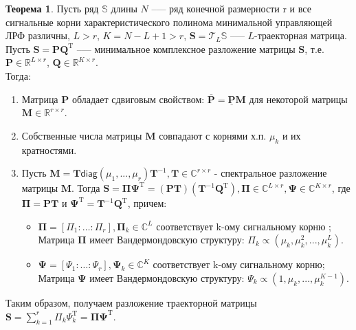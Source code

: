 \documentclass[specialist, substylefile = spbureport.rtx, subf,href,colorlinks=true, 12pt]{disser}
\theoremstyle{definition}
\newtheorem{theorem}{Теорема}
\begin{document}
\begin{theorem}
\label{th1}
Пусть ряд $\mathbb{S}$ длины $N$ --— ряд конечной размерности r и все сигнальные корни характеристического полинома минимальной управляющей ЛРФ различны, $L > r$, $K = N - L + 1 > r$, $\mathbf{S} = \mathcal{T}_L\mathbb{S}$ --— $L$-траекторная матрица. Пусть $\mathbf{S} = \mathbf{P Q}^{\mathrm{T}}$ --— минимальное комплексное разложение матрицы $\mathbf{S}$, т.е. $\mathbf{P} \in \mathbb{R}^{L \times r}$, $\mathbf{Q} \in \mathbb{R}^{K \times r}$. \\
    \hspace*{0.5cm} Тогда:
    \begin{enumerate}
        \item Матрица $\mathbf{P}$ обладает сдвиговым свойством: $\overline{\mathbf{P}} = \underline{\mathbf{P}}\mathbf{M}$ для некоторой матрицы $\mathbf{M} \in \mathbb{R}^{r \times r}$.
        \item Собственные числа матрицы $\mathbf{M}$ совпадают с корнями х.п. $\mu_k$ и их кратностями.
        \item Пусть $\mathbf{M} = \mathbf{T}\mathsf{diag}(\mu_1, ..., \mu_r)\mathbf{T}^{-1}, \mathbf{T} \in \mathbb{C}^{r \times r}$ - спектральное разложение матрицы $\mathbf{M}$.
        Тогда $\mathbf{S} = \mathbf{\Pi \Psi}^{\mathrm{T}} = (\mathbf{PT})(\mathbf{T}^{-1}\mathbf{ Q}^{\mathrm{T}}), \mathbf{\Pi} \in \mathbb{C}^{L \times r}, \mathbf{\Psi} \in \mathbb{C}^{K \times r}$, где $\mathbf{\Pi} = \mathbf{PT}$ и $\mathbf{\Psi}^{\mathrm{T}} = \mathbf{T}^{-1}\mathbf{Q}^{\mathrm{T}}$, причем:
        \begin{itemize}
            \item $\mathbf{\Pi} = [\Pi_1: \ldots :\Pi_r], \mathbf{\Pi}_k \in \mathbb{C}^{L}$ соответствует k-ому сигнальному корню ; Матрица $\mathbf{\Pi}$ имеет Вандермондовскую структуру: $\Pi_k \propto (\mu_k, \mu_k^2, ..., \mu_k^L)$.
            
            \item $\mathbf{\Psi} = [\Psi_1: \ldots :\Psi_r], \mathbf{\Psi}_k \in \mathbb{C}^{K}$ соответствует k-ому сигнальному корню; Матрица $\mathbf{\Psi}$ имеет Вандермондовскую структуру: $\Psi_k \propto (1, \mu_k, ..., \mu_k^{K - 1})$.
        \end{itemize}
    \end{enumerate}

\end{theorem}
Таким образом, получаем разложение траекторной матрицы $\mathbf{S} = \sum^r_{k=1} \Pi_k\Psi_k^{\mathrm{T}} = \mathbf{\Pi \Psi}^{\mathrm{T}}$. 
\end{document}
